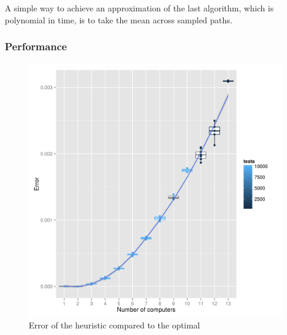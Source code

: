 \documentclass[11pt]{llncs}
\begin{document}
		A simple way to achieve an approximation of the last algorithm, which is polynomial in time, is to take the mean across sampled paths.
		
		\subsubsection{Performance}
		
		\begin{figure}
		\includegraphics{boxexheur.jpg} %
		\caption{Error of the heuristic compared to the optimal}
		\end{figure}
		
\end{document}
